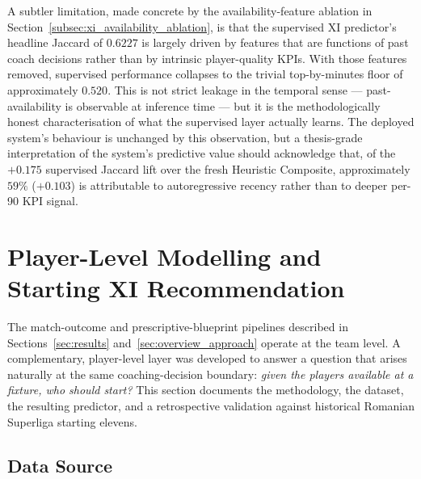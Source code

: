 A subtler limitation, made concrete by the availability-feature ablation in Section~\ref{subsec:xi_availability_ablation}, is that the supervised XI predictor's headline Jaccard of $0.6227$ is largely driven by features that are functions of past coach decisions rather than by intrinsic player-quality KPIs. With those features removed, supervised performance collapses to the trivial top-by-minutes floor of approximately $0.520$. This is not strict leakage in the temporal sense --- past-availability is observable at inference time --- but it is the methodologically honest characterisation of what the supervised layer actually learns. The deployed system's behaviour is unchanged by this observation, but a thesis-grade interpretation of the system's predictive value should acknowledge that, of the $+0.175$ supervised Jaccard lift over the fresh Heuristic Composite, approximately $59\%$ ($+0.103$) is attributable to autoregressive recency rather than to deeper per-90 KPI signal.

\section{Player-Level Modelling and Starting XI \mbox{Recommendation}}
\label{sec:xi}

The match-outcome and prescriptive-blueprint pipelines described in Sections~\ref{sec:results} and~\ref{sec:overview_approach} operate at the team level. A complementary, player-level layer was developed to answer a question that arises naturally at the same coaching-decision boundary: \emph{given the players available at a fixture, who should start?} This section documents the methodology, the dataset, the resulting predictor, and a retrospective validation against historical Romanian Superliga starting elevens.

\subsection{Data Source}
\label{subsec:xi_data}

